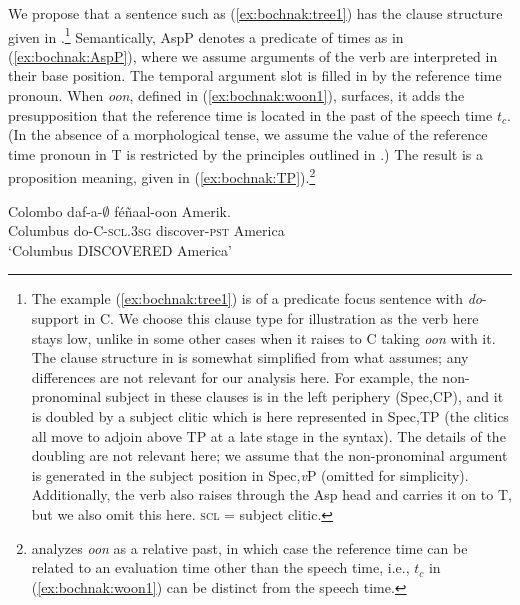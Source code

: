 \documentclass[output=paper,newtxmath,modfonts,nonflat,draftmode]{langsci/langscibook}
\begin{document}
We propose that a sentence such as (\ref{ex:bochnak:tree1}) has the clause
structure given in .\footnote{The example
  (\ref{ex:bochnak:tree1}) is of a predicate focus sentence with
  \textit{do}-support in C. We choose this clause type for
  illustration as the verb here stays low, unlike in some other cases
  when it raises to C taking \textit{oon} with it. The clause structure
 in  is somewhat simplified from what \cite{Martinovic2015b} assumes; any
differences are not relevant for our analysis here. For example, the
non-pronominal subject in these clauses is in the left periphery
(Spec,CP), and it is doubled by a subject clitic which is here
represented in Spec,TP (the clitics all move to adjoin above TP at a
late stage in the syntax). The details of the doubling are not
relevant here; we assume that the non-pronominal argument is generated
in the subject position in Spec,\textit{v}P (omitted for simplicity). Additionally, the verb also
raises through the Asp head and carries it on to T, but we also omit this
here. \textsc{scl} = subject clitic.} Semantically, AspP denotes a predicate of times as in (\ref{ex:bochnak:AspP}), where we assume arguments of the verb are interpreted in their base position. The temporal argument slot is filled in by the reference time pronoun. When  \textit{oon}, defined in (\ref{ex:bochnak:woon1}), surfaces, it adds the presupposition that the reference time is located in the past of the speech time $t_c$. (In the absence of a morphological tense, we assume the value of the reference time pronoun in T is restricted by the principles outlined in .) The result is a proposition meaning, given in (\ref{ex:bochnak:TP}).\footnote{\citet{robert91approche} analyzes \textit{oon} as a relative past, in which case the reference time can be related to an evaluation time other than the speech time, i.e., $t_c$ in (\ref{ex:bochnak:woon1}) can be distinct from the speech time.}

\ea\label{ex:bochnak:tree1} \gll Colombo daf-a-$\emptyset$ f\'e\~naal-oon Amerik.\\
Columbus do-C-\textsc{scl.3sg} discover-\textsc{pst} America\\
\glt`Columbus DISCOVERED America'
\z
\end{document}
